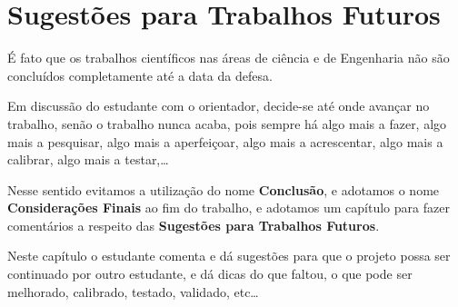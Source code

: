 \chapter{Sugestões para Trabalhos Futuros}

    É fato que os trabalhos científicos nas áreas de ciência e de Engenharia não são concluídos completamente até a data da defesa.
    
    Em discussão do estudante com o orientador, decide-se até onde avançar no trabalho, senão o trabalho nunca acaba, pois sempre há algo mais a fazer, algo mais a pesquisar, algo mais a aperfeiçoar, algo mais a acrescentar, algo mais a calibrar, algo mais a testar,\ldots

    Nesse sentido evitamos a utilização do nome {\bf Conclusão}, e adotamos o nome {\bf Considerações Finais} ao fim do trabalho, e adotamos um capítulo para fazer comentários a respeito das {\bf Sugestões para Trabalhos Futuros}.

    Neste capítulo o estudante comenta e dá sugestões para que o projeto possa ser continuado por outro estudante, e dá dicas do que faltou, o que pode ser melhorado, calibrado, testado, validado, etc\ldots